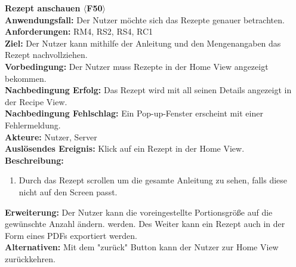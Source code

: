 \documentclass[parskip=full]{scrartcl}
\begin{document}
\textbf{Rezept anschauen $\langle$F50$\rangle$}\\
\textbf{Anwendungsfall:} Der Nutzer möchte sich das Rezepte genauer betrachten.\\
\textbf{Anforderungen:} RM4, RS2, RS4, RC1\\
\textbf{Ziel:} Der Nutzer kann mithilfe der Anleitung und den Mengenangaben das Rezept nachvollziehen.\\
\textbf{Vorbedingung:} Der Nutzer muss Rezepte in der Home View angezeigt bekommen.\\
\textbf{Nachbedingung Erfolg:} Das Rezept wird mit all seinen Details angezeigt in der Recipe View.\\
\textbf{Nachbedingung Fehlschlag:} Ein Pop-up-Fenster erscheint mit einer Fehlermeldung.\\
\textbf{Akteure:} Nutzer, Server\\
\textbf{Auslösendes Ereignis:} Klick auf ein Rezept in der Home View.\\
\textbf{Beschreibung:}
\begin{enumerate}
    \item Durch das Rezept scrollen um die gesamte Anleitung zu sehen, falls diese nicht auf den Screen passt.
\end{enumerate}
\textbf{Erweiterung:} Der Nutzer kann die voreingestellte Portionsgröße auf die gewünschte Anzahl ändern. werden. Des Weiter kann ein Rezept auch in der Form eines PDFs exportiert werden.\\
\textbf{Alternativen:} Mit dem "zurück" Button kann der Nutzer zur Home View zurückkehren.\\
\newpage
\end{document}
